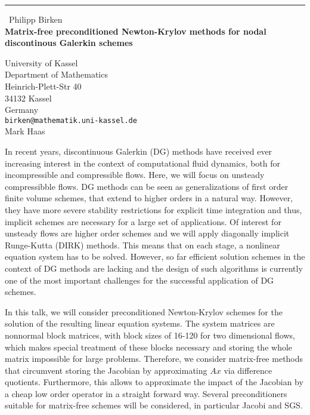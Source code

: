 \documentclass{report}
\begin{document}
\begin{center}
\rule{6in}{1pt} \
{\large Philipp Birken \\
{\bf Matrix-free preconditioned Newton-Krylov methods for nodal discontinous Galerkin schemes}}

University of Kassel \\ Department of Mathematics \\ Heinrich-Plett-Str 40 \\ 34132 Kassel \\ Germany
\\
{\tt birken@mathematik.uni-kassel.de}\\
Mark Haas\end{center}

In recent years, discontinuous Galerkin (DG) methods have received ever
increasing interest in the context of computational fluid dynamics, both
for incompressible and compressible flows. Here, we will focus on
unsteady compressibble flows. DG methods can be seen as generalizations
of first order finite volume schemes, that extend to higher orders in a
natural way. However, they have more severe stability restrictions for
explicit time integration and thus, implicit schemes are necessary for a
large set of applications. Of interest for unsteady flows are higher
order schemes and we will apply diagonally implicit Runge-Kutta (DIRK)
methods. This means that on each stage, a nonlinear equation system has
to be solved. However, so far efficient solution schemes in the context
of DG methods are lacking and the design of such algorithms is currently
one of the most important challenges for the successful application of DG
schemes.

In this talk, we will consider preconditioned Newton-Krylov schemes for
the solution of the resulting linear equation systems. The system
matrices are nonnormal block matrices, with block sizes of 16-120 for two
dimensional flows, which makes special treatment of these blocks
necessary and storing the whole matrix impossible for large problems.
Therefore, we consider matrix-free methods that circumvent storing the
Jacobian by approximating $Ax$ via difference quotients. Furthermore,
this allows to approximate the impact of the Jacobian by a cheap low
order operator in a straight forward way. Several preconditioners
suitable for matrix-free schemes will be considered, in particular Jacobi
and SGS.
\end{document}

